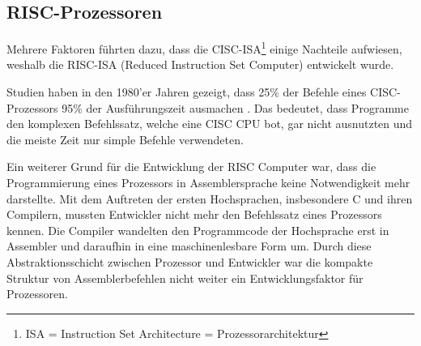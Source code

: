 \documentclass[a4paper,12pt]{article}
\begin{document}

\subsection{RISC-Prozessoren}
Mehrere Faktoren führten dazu, dass die CISC-ISA\footnote{ISA = Instruction Set Architecture = Prozessorarchitektur} einige Nachteile aufwiesen, weshalb die RISC-ISA (Reduced Instruction Set Computer) entwickelt wurde.

\par \bigskip
\noindent Studien haben in den 1980'er Jahren gezeigt, dass 25\% der Befehle eines CISC-Prozessors 95\% der Ausführungszeit ausmachen \cite{jamil1995risc}. Das bedeutet, dass Programme den komplexen Befehlssatz, welche eine CISC CPU bot, gar nicht ausnutzten und die meiste Zeit nur simple Befehle verwendeten. \cite{patterson1985reduced} 

\par \bigskip
\noindent Ein weiterer Grund für die Entwicklung der RISC Computer war, dass die Programmierung eines Prozessors in Assemblersprache keine Notwendigkeit mehr darstellte. Mit dem Auftreten der ersten Hochsprachen, insbesondere C und ihren Compilern, mussten Entwickler nicht mehr den Befehlssatz eines Prozessors kennen. Die Compiler wandelten den Programmcode der Hochsprache erst in Assembler und daraufhin in eine maschinenlesbare Form um. Durch diese Abstraktionsschicht zwischen Prozessor und Entwickler war die kompakte Struktur von Assemblerbefehlen nicht weiter ein Entwicklungsfaktor für Prozessoren.
\end{document}
